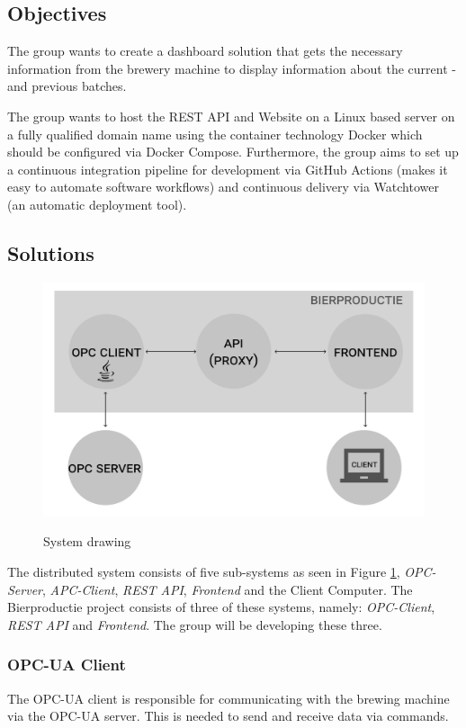 \subsection{Objectives}
The group wants to create a dashboard solution that gets the necessary
information from the brewery machine to display information about the current
- and previous batches.

The group wants to host the REST API and Website on a Linux based server on a
fully qualified domain name using the container technology Docker which should
be configured via Docker Compose. Furthermore, the group aims to set up a
continuous integration pipeline for development via GitHub Actions (makes it
easy to automate software workflows) and continuous delivery via Watchtower (an
automatic deployment tool).

\subsection{Solutions}
\begin{figure}[h]
\centering 
\includegraphics[scale=0.3]{../project_proposal/images/system_drawing.pdf}
\label{figure:System_drawing}
\caption{System drawing} 
\end{figure}

The distributed system consists of five sub-systems as seen in Figure
\ref{figure:System_drawing}, \textit{OPC-Server}, \textit{APC-Client},
\textit{REST API}, \textit{Frontend} and the Client Computer. The Bierproductie
project consists of three of these systems, namely: \textit{OPC-Client},
\textit{REST API} and \textit{Frontend}. The group will be developing these
three.

\subsubsection{OPC-UA Client}
The OPC-UA client is responsible for communicating with the brewing machine via
the OPC-UA server. This is needed to send and receive data via
commands.

